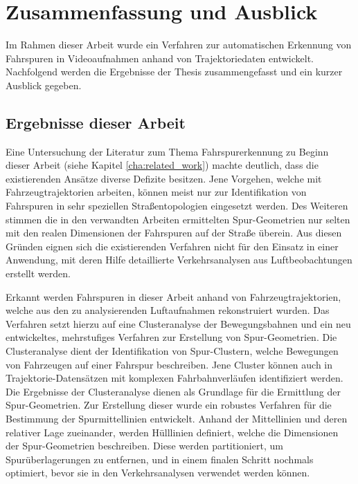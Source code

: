 
\chapter{Zusammenfassung und Ausblick}
\label{cha:end}

Im Rahmen dieser Arbeit wurde ein Verfahren zur automatischen Erkennung von Fahrspuren in Videoaufnahmen
anhand von Trajektoriedaten entwickelt.
Nachfolgend werden die Ergebnisse der Thesis zusammengefasst und ein kurzer Ausblick gegeben.

\section{Ergebnisse dieser Arbeit}

Eine Untersuchung der Literatur zum Thema Fahrspurerkennung zu Beginn dieser Arbeit
(siehe Kapitel \ref{cha:related_work}) machte deutlich, dass die existierenden Ansätze diverse
Defizite besitzen.
Jene Vorgehen, welche mit Fahrzeugtrajektorien arbeiten, können meist nur zur Identifikation von Fahrspuren
in sehr speziellen Straßentopologien eingesetzt werden.
Des Weiteren stimmen die in den verwandten Arbeiten ermittelten Spur-Geometrien nur selten mit den realen Dimensionen
der Fahrspuren auf der Straße überein.
Aus diesen Gründen eignen sich die existierenden Verfahren nicht für den Einsatz in einer
Anwendung, mit deren Hilfe detaillierte Verkehrsanalysen aus Luftbeobachtungen erstellt werden.

Erkannt werden Fahrspuren in dieser Arbeit anhand von Fahrzeugtrajektorien, welche aus den zu analysierenden
Luftaufnahmen rekonstruiert wurden. Das Verfahren setzt hierzu auf eine Clusteranalyse der Bewegungsbahnen
und ein neu entwickeltes, mehrstufiges Verfahren zur Erstellung von Spur-Geometrien.
Die Clusteranalyse dient der Identifikation von Spur-Clustern, welche Bewegungen von Fahrzeugen auf einer Fahrspur beschreiben.
Jene Cluster können auch in Trajektorie-Datensätzen mit komplexen Fahrbahnverläufen identifiziert werden.
Die Ergebnisse der Clusteranalyse dienen als Grundlage für die Ermittlung der Spur-Geometrien.
Zur Erstellung dieser wurde ein robustes Verfahren für die Bestimmung der Spurmittellinien entwickelt.
Anhand der Mittellinien und deren relativer Lage zueinander, werden Hülllinien definiert,
welche die Dimensionen der Spur-Geometrien beschreiben. Diese werden partitioniert,
um Spurüberlagerungen zu entfernen, und in einem finalen Schritt nochmals optimiert,
bevor sie in den Verkehrsanalysen verwendet werden können.

